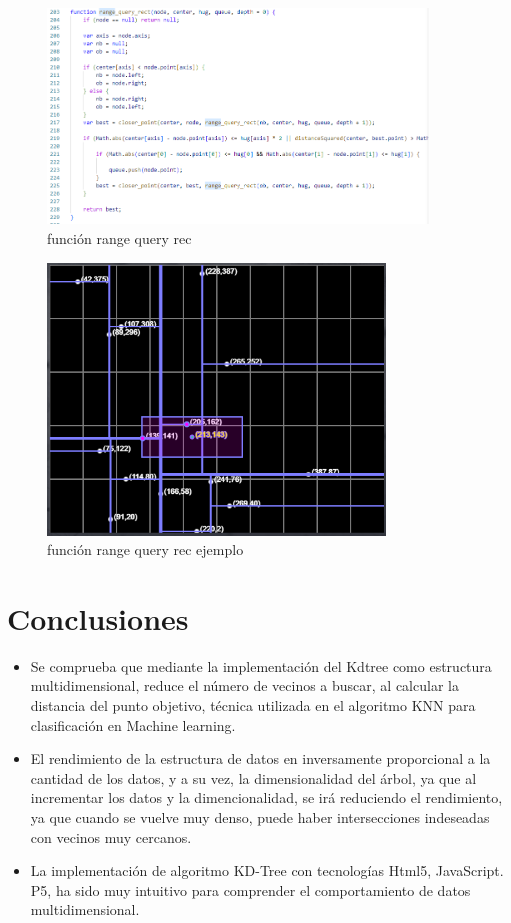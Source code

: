\documentclass{article}
\begin{document}
\begin{enumerate}
\begin{figure}[H]
\centering
\includegraphics[width=0.9\textwidth]{Img/range_rect.png}
\caption{función range query rec}
\end{figure}

\begin{figure}[H]
\centering
\includegraphics[width=0.8\textwidth]{Img/range_rect_ej.png}
\caption{función range query rec ejemplo}
\end{figure}

\section{Conclusiones}

\begin{itemize}
   \item Se comprueba que mediante la implementación del Kdtree como estructura multidimensional, reduce el número de vecinos a buscar, al calcular la distancia del punto objetivo, técnica utilizada en el algoritmo KNN para clasificación en Machine learning.
   \item El rendimiento de la estructura de datos en inversamente proporcional a la cantidad de los datos, y a su vez, la dimensionalidad del árbol, ya que al incrementar los datos y la dimencionalidad, se irá reduciendo el rendimiento, ya que  cuando se vuelve muy denso, puede haber intersecciones indeseadas con vecinos muy cercanos.
   \item La implementación de algoritmo KD-Tree con tecnologías Html5, JavaScript. P5, ha sido muy intuitivo para comprender el comportamiento de datos multidimensional.


\end{itemize}
\end{enumerate}
\end{document}
